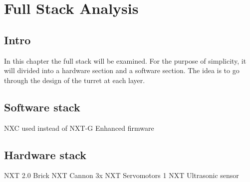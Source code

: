 \chapter{Full Stack Analysis}

\section{Intro}
In this chapter the full stack will be examined. For the purpose of simplicity, it
will divided into a hardware section and a software section. The idea is to go through the
design of the turret at each layer.

\section{Software stack}
NXC used instead of NXT-G
Enhanced firmware


\section{Hardware stack}
NXT 2.0 Brick
NXT Cannon
3x NXT Servomotors
1 NXT Ultrasonic sensor
